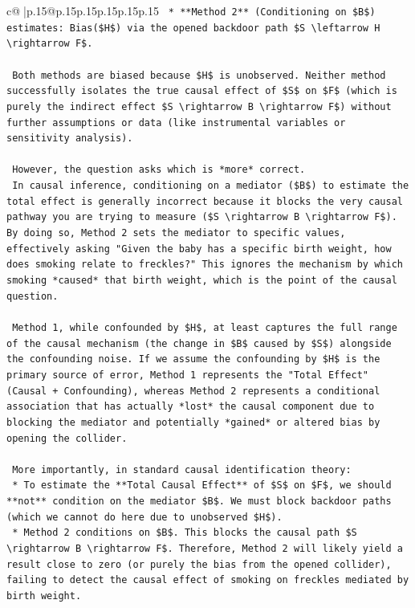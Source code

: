 \documentclass{article}
\begin{document}
{\begin{supertabular}{c@{$\;$}|p{.15\linewidth}@{}p{.15\linewidth}p{.15\linewidth}p{.15\linewidth}p{.15\linewidth}p{.15\linewidth}}
{{{\texttt{    *   **Method 2** (Conditioning on \$B\$) estimates: Bias(\$H\$) via the opened backdoor path \$S \textbackslash{}leftarrow H \textbackslash{}rightarrow F\$.} \\
\\ 
\texttt{    Both methods are biased because \$H\$ is unobserved. Neither method successfully isolates the true causal effect of \$S\$ on \$F\$ (which is purely the indirect effect \$S \textbackslash{}rightarrow B \textbackslash{}rightarrow F\$) without further assumptions or data (like instrumental variables or sensitivity analysis).} \\
\\ 
\texttt{    However, the question asks which is *more* correct.} \\
\texttt{    In causal inference, conditioning on a mediator (\$B\$) to estimate the total effect is generally incorrect because it blocks the very causal pathway you are trying to measure (\$S \textbackslash{}rightarrow B \textbackslash{}rightarrow F\$). By doing so, Method 2 sets the mediator to specific values, effectively asking "Given the baby has a specific birth weight, how does smoking relate to freckles?" This ignores the mechanism by which smoking *caused* that birth weight, which is the point of the causal question.} \\
\\ 
\texttt{    Method 1, while confounded by \$H\$, at least captures the full range of the causal mechanism (the change in \$B\$ caused by \$S\$) alongside the confounding noise. If we assume the confounding by \$H\$ is the primary source of error, Method 1 represents the "Total Effect" (Causal + Confounding), whereas Method 2 represents a conditional association that has actually *lost* the causal component due to blocking the mediator and potentially *gained* or altered bias by opening the collider.} \\
\\ 
\texttt{    More importantly, in standard causal identification theory:} \\
\texttt{    *   To estimate the **Total Causal Effect** of \$S\$ on \$F\$, we should **not** condition on the mediator \$B\$. We must block backdoor paths (which we cannot do here due to unobserved \$H\$).} \\
\texttt{    *   Method 2 conditions on \$B\$. This blocks the causal path \$S \textbackslash{}rightarrow B \textbackslash{}rightarrow F\$. Therefore, Method 2 will likely yield a result close to zero (or purely the bias from the opened collider), failing to detect the causal effect of smoking on freckles mediated by birth weight.} \\
}}}
\end{supertabular}}
\end{document}
